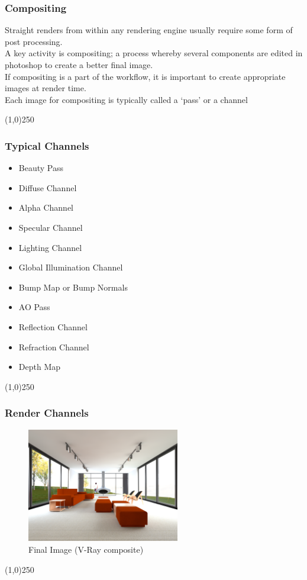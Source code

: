 \begin{frame}
	\frametitle{Compositing}
	Straight renders from within any rendering engine usually require some form of post processing.\\
	A key activity is compositing; a process whereby several components are edited in photoshop to create a better final image.\\
	If compositing is a part of the workflow, it is important to create appropriate images at render time.\\
	Each image for compositing is typically called a `pass' or a channel
	
\end{frame}
\begin{center}\line(1,0){250}\end{center}


\begin{frame}
	\frametitle{Typical Channels}
	\begin{itemize}
		\item Beauty Pass
		\item Diffuse Channel
		\item Alpha Channel
		\item Specular Channel
		\item Lighting Channel
		\item Global Illumination Channel
		\item Bump Map or Bump Normals
		\item AO Pass
		\item Reflection Channel
		\item Refraction Channel
		\item Depth Map
	\end{itemize}
\end{frame}
\begin{center}\line(1,0){250}\end{center}



\begin{frame}
\frametitle{Render Channels}
\begin{figure}
	\centering
	\includegraphics[height=5cm]{./img/Rendering/SittingRoomFinal.png}
	\caption[Final Image (V-Ray composite)]{Final Image (V-Ray composite)}
	\label{fig:sittingroomfinalBeauty}
\end{figure}
\end{frame}
\begin{center}\line(1,0){250}\end{center}


